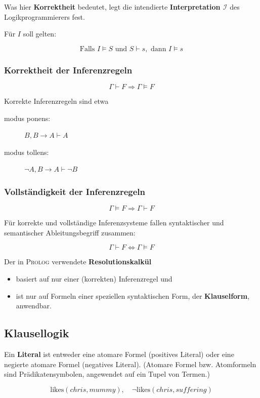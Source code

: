 \documentclass[runningheads,deutsch]{llncs}
\begin{document}
Was hier \textbf{Korrektheit} bedeutet, legt die intendierte \textbf{Interpretation  $\mathcal I$} des Logikprogrammierers fest.


Für $I$ soll gelten:

\[ \text{Falls } I \vDash S \text{ und } S \vdash s, \text{ dann } I \vDash s \]

\subsubsection{Korrektheit der Inferenzregeln}
\[ \Gamma \vdash F \Rightarrow \Gamma \vDash F \]

\parindent 0mm
Korrekte Inferenzregeln sind etwa
\begin{description}
    \item[modus ponens:] $B, B \rightarrow A \vdash A$
    \item[modus tollens:] $\lnot A, B \rightarrow A \vdash \lnot B$ 
\end{description}

\subsubsection{Vollständigkeit der Inferenzregeln}
\[ \Gamma \vDash F \Rightarrow \Gamma \vdash F \]

Für korrekte und vollständige Inferenzsysteme fallen syntaktischer und semantischer Ableitungsbegriff zusammen:

\[ \Gamma \vdash F \Leftrightarrow \Gamma \vDash F \]

Der in \textsc{Prolog} verwendete \textbf{Resolutionskalkül}
\begin{itemize}
    \item basiert auf nur einer (korrekten) Inferenzregel und
    \item ist nur auf Formeln einer speziellen syntaktischen Form, der \textbf{Klauselform}, anwendbar.
\end{itemize}

\subsection{Klausellogik}

Ein \textbf{Literal} ist entweder eine atomare Formel (positives Literal) oder eine negierte atomare Formel (negatives Literal). (Atomare Formel bzw. Atomformeln sind Prädikatensymbolen, angewendet auf ein Tupel von Termen.)

\begin{example}
    \[ \text{likes}(chris, mummy), \quad \lnot\text{likes}(chris, suffering) \]
\end{example}
\end{document}

